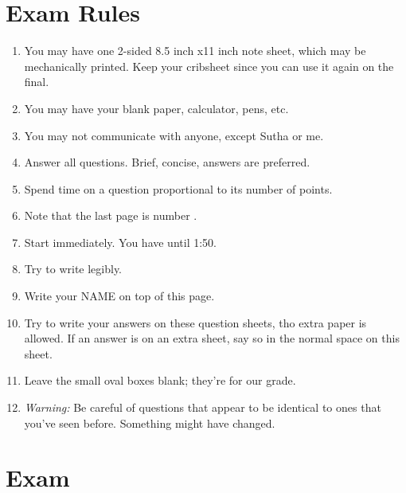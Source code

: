 \documentclass[twoside]{article}
\begin{document}
\section*{Exam Rules}
\begin{enumerate}
\setlength{\itemsep}{0pt}
\item You may have one 2-sided 8.5 inch x11 inch note sheet, which may be
mechanically printed.  Keep your cribsheet since you can use it again on
the final.
\item You may have your blank paper, calculator, pens, etc.
\item You may not communicate with anyone, except Sutha or me.
\item Answer all questions.  Brief, concise, answers are preferred.
\item Spend time on a question proportional to its number of points.
\item Note that the last page is number  \pageref{end}.
\item Start immediately.  You have until 1:50.
\item Try to write legibly.
\item Write your NAME on top of this page.
\item Try to write your answers on these question sheets, tho extra
paper is allowed.  If an answer is on an extra sheet, say so in
the normal space on this sheet.
\item Leave the small oval boxes blank; they're for our grade.
\item \emph{Warning:}  Be careful of questions that appear to be identical to ones that you've seen before.  Something might have changed.
\end{enumerate}

\section*{Exam}
\end{document}

